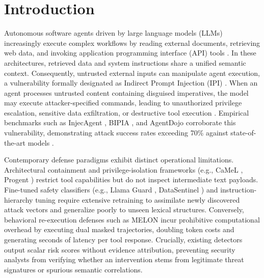 \documentclass[conference]{IEEEtran}
\begin{document}
\section{Introduction}
Autonomous software agents driven by large language models (LLMs) increasingly execute complex workflows by reading external documents, retrieving web data, and invoking application programming interface (API) tools \cite{yao2023react, schick2023toolformer}. In these architectures, retrieved data and system instructions share a unified semantic context. Consequently, untrusted external inputs can manipulate agent execution, a vulnerability formally designated as Indirect Prompt Injection (IPI) \cite{greshake2023not, owasp2025llm01}. When an agent processes untrusted content containing disguised imperatives, the model may execute attacker-specified commands, leading to unauthorized privilege escalation, sensitive data exfiltration, or destructive tool execution \cite{vassilev2025adversarial}. Empirical benchmarks such as InjecAgent \cite{zhan2024injecagent}, BIPIA \cite{yi2023benchmarking}, and AgentDojo \cite{debenedetti2024agentdojo} corroborate this vulnerability, demonstrating attack success rates exceeding 70\% against state-of-the-art models \cite{wang2025agentvigil, zhan2025adaptive}.

Contemporary defense paradigms exhibit distinct operational limitations. Architectural containment and privilege-isolation frameworks (e.g., CaMeL \cite{debenedetti2025defeating}, Progent \cite{shi2025progent}) restrict tool capabilities but do not inspect intermediate text payloads. Fine-tuned safety classifiers (e.g., Llama Guard \cite{inan2023llama}, DataSentinel \cite{liu2025datasentinel}) and instruction-hierarchy tuning \cite{wallace2024instruction} require extensive retraining to assimilate newly discovered attack vectors and generalize poorly to unseen lexical structures. Conversely, behavioral re-execution defenses such as MELON \cite{zhu2025melon} incur prohibitive computational overhead by executing dual masked trajectories, doubling token costs and generating seconds of latency per tool response. Crucially, existing detectors output scalar risk scores without evidence attribution, preventing security analysts from verifying whether an intervention stems from legitimate threat signatures or spurious semantic correlations.
\end{document}
